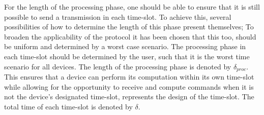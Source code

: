 \bigskip \noindent
For the length of the processing phase, one should be able to ensure that it is still possible to send a transmission in each time-slot.
To achieve this, several possibilities of how to determine the length of this phase present themselves; To broaden the applicability of the protocol it has been chosen that this too, should be uniform and determined by a worst case scenario.%
The processing phase in each time-slot should be determined by the user, such that it is the worst time scenario for all devices.
The length of the processing phase is denoted by $\delta_{proc}$.
This ensures that a device can perform its computation within its own time-slot while allowing for the opportunity to receive and compute commands when it is not the device's designated time-slot,  represents the design of the time-slot.
The total time of each time-slot is denoted by $\delta$.


